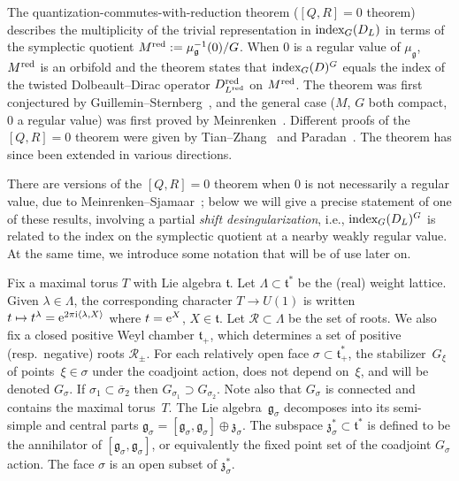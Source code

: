 \documentclass[11pt]{article}
\numberwithin{equation}{section}
\newcommand{\pair}[2]{\langle #1, #2 \rangle}
\newcommand{\ol}[1]{\overline{#1}}
\newcommand{\tn}[1]{\textnormal{#1}}
\renewcommand{\i}{{\mathrm{i}}}
\def\g{\ensuremath{\mathfrak{g}}}
\def\z{\ensuremath{\mathfrak{z}}}
\def\t{\ensuremath{\mathfrak{t}}}
\def\R{\ensuremath{\mathcal{R}}}
\def\index{\ensuremath{\textnormal{index}}}
\begin{document}
The quantization-commutes-with-reduction theorem ($[Q,R]=0$ theorem) describes the multiplicity of the trivial representation in $\index_G(D_L)$ in terms of the symplectic quotient $M^{\tn{red}}:=\mu_\g^{-1}(0)/G$. When $0$ is a regular value of $\mu_\g$, $M^{\tn{red}}$ is an orbifold and the theorem states that $\index_G(D)^G$ equals the index of the twisted Dolbeault--Dirac operator $D^{\tn{red}}_{L^{\tn{red}}}$ on $M^{\tn{red}}$. The theorem was first conjectured by Guillemin--Sternberg~\cite{GuilleminSternbergConjecture}, and the general case ($M$, $G$ both compact, $0$ a regular value) was first proved by Meinrenken~\cite{MeinrenkenSymplecticSurgery}. Different proofs of the $[Q,R]=0$ theorem were given by Tian--Zhang~\cite{TianZhang} and Paradan~\cite{ParadanRiemannRoch}. The theorem has since been extended in various directions.

There are versions of the $[Q,R]=0$ theorem when $0$ is not necessarily a regular value, due to Meinrenken--Sjamaar~\cite{MeinrenkenSjamaar}; below we will give a precise statement of one of these results, involving a partial \emph{shift desingularization}, i.e., $\index_G(D_L)^G$ is related to the index on the symplectic quotient at a nearby weakly regular value. At the same time, we introduce some notation that will be of use later on.

Fix a maximal torus $T$ with Lie algebra $\t$. Let $\Lambda \subset \t^\ast$ be the (real) weight lattice. Given $\lambda \in \Lambda$, the corresponding character $T \rightarrow U(1)$ is written $t \mapsto t^\lambda={\rm e}^{2\pi \i\pair{\lambda}{X}}$ where $t={\rm e}^X$, $X \in \t$. Let $\R \subset \Lambda$ be the set of roots. We also fix a closed positive Weyl chamber $\t_+$, which determines a set of positive (resp.\ negative) roots $\R_{\pm}$. For each relatively open face $\sigma \subset \t_+^\ast$, the stabilizer~$G_\xi$ of points~$\xi \in \sigma$ under the coadjoint action, does not depend on~$\xi$, and will be denoted $G_\sigma$. If $\sigma_1 \subset \ol{\sigma}_2$ then $G_{\sigma_1}\supset G_{\sigma_2}$. Note also that $G_\sigma$ is connected and contains the maximal torus~$T$. The Lie algebra~$\g_\sigma$ decomposes into its semi-simple and central parts
$ \g_\sigma=[\g_\sigma,\g_\sigma]\oplus \z_\sigma$.
The subspace $\z_\sigma^\ast \subset \t^\ast$ is defined to be the annihilator of $[\g_\sigma,\g_\sigma]$, or equivalently the fixed point set of the coadjoint $G_\sigma$ action. The face $\sigma$ is an open subset of $\z_\sigma^\ast$.
\end{document}
